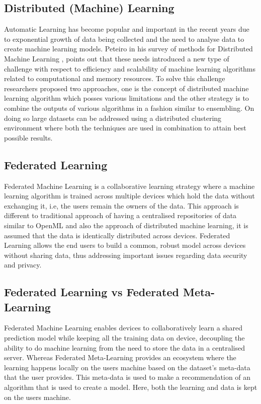 \subsection*{Distributed (Machine) Learning}
Automatic Learning has become popular and important in the recent years due to exponential growth of data being collected and the need to analyse data to create machine learning models. Peteiro in his survey of methods for Distributed Machine Learning \citep{disml}, points out that these needs introduced a new type of challenge with respect to efficiency and scalability of machine learning algorithms related to computational and memory resources. To solve this challenge researchers proposed two approaches, one is the concept of distributed machine learning algorithm which posses various limitations and the other strategy is to combine the outputs of various algorithms in a fashion similar to ensembling. On doing so large datasets can be addressed using a distributed clustering environment where both the techniques are used in combination to attain best possible results.

\subsection*{Federated Learning}
Federated Machine Learning \citep{fedml-google} is a collaborative learning strategy where a machine learning algorithm is trained across multiple devices which hold the data without exchanging it, i.e, the users remain the owners of the data. This approach is different to traditional approach of having a centralised repositories of data similar to OpenML \citep{OpenML2013} and also the approach of distributed machine learning, it is assumed that the data is identically distributed across devices. Federated Learning allows the end users to build a common, robust model across devices without sharing data, thus addressing important issues regarding data security and privacy.

\subsection*{Federated Learning vs Federated Meta-Learning}

Federated Machine Learning enables devices to collaboratively learn a shared prediction model while keeping all the training data on device, decoupling the ability to do machine learning from the need to store the data in a centralised server. Whereas Federated Meta-Learning provides an ecosystem where the learning happens locally on the users machine based on the dataset's meta-data that the user provides. This meta-data is used to make a recommendation of an algorithm that is used to create a model. Here, both the learning and data is kept on the users machine.


